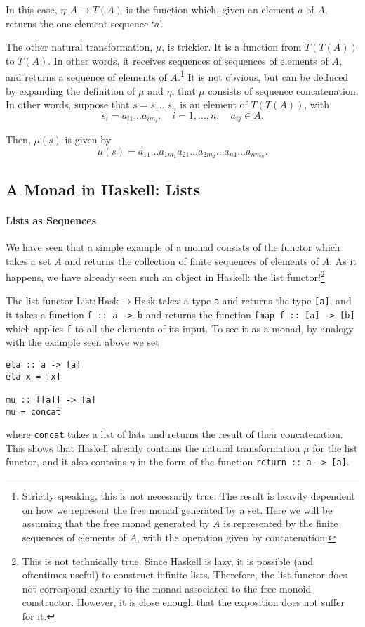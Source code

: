 \documentclass[11pt]{article}
\theoremstyle{nonumberplain}
\newcommand{\Hask}{\mathrm{Hask}}
\newcommand{\type}[1]{\mathrm{#1}}
\newcommand*\lsin{\lstinline}
\begin{document}
In this case, $\eta \colon A \to T(A)$ is the function which, given an element $a$ of $A$, returns the one-element sequence `$a$'.

The other natural transformation, $\mu$, is trickier. It is a function from $T(T(A))$ to $T(A)$. In other words, it receives sequences of sequences of elements of $A$, and returns a sequence of elements of $A$.\footnote{Strictly speaking, this is not necessarily true. The result is heavily dependent on how we represent the free monad generated by a set. Here we will be assuming that the free monad generated by $A$ is represented by the finite sequences of elements of $A$, with the operation given by concatenation.} It is not obvious, but can be deduced by expanding the definition of $\mu$ and $\eta$, that $\mu$ consists of sequence concatenation. In other words, suppose that $s = s_1 \dots s_n$ is an element of $T(T(A))$, with
\begin{equation}
s_i = a_{i1} \dots a_{i m_i}, \quad i = 1, \dots, n, \quad a_{ij} \in A.
\end{equation}

Then, $\mu(s)$ is given by
\begin{equation}
\mu(s) = a_{11} \dots a_{1 m_1} a_{21} \dots a_{2 m_2} \dots a_{n1} \dots a_{n m_n}.
\end{equation}

\subsection{A Monad in Haskell: Lists}

\paragraph{Lists as Sequences}

We have seen that a simple example of a monad consists of the functor which takes a set $A$ and returns the collection of finite sequences of elements of $A$. As it happens, we have already seen such an object in Haskell: the list functor!\footnote{This is not technically true. Since Haskell is lazy, it is possible (and oftentimes useful) to construct infinite lists. Therefore, the list functor does not correspond exactly to the monad associated to the free monoid constructor. However, it is close enough that the exposition does not suffer for it.}

The list functor $\type{List} \colon \Hask \to \Hask$ takes a type \lsin|a| and returns the type \lsin|[a]|, and it takes a function \lsin|f :: a -> b| and returns the function \lsin|fmap f :: [a] -> [b]| which applies \lsin|f| to all the elements of its input. To see it as a monad, by analogy with the example seen above we set
\begin{lstlisting}
eta :: a -> [a]
eta x = [x]

mu :: [[a]] -> [a]
mu = concat
\end{lstlisting}
where \lsin|concat| takes a list of lists and returns the result of their concatenation. This shows that Haskell already contains the natural transformation $\mu$ for the list functor, and it also contains $\eta$ in the form of the function \lsin|return :: a -> [a]|.
\end{document}
